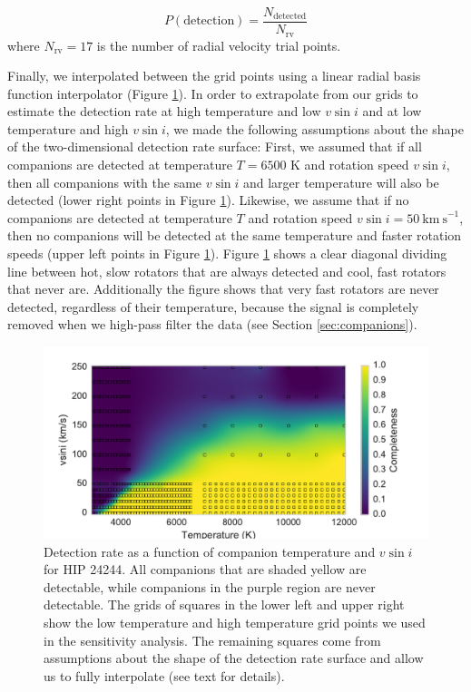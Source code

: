 \documentclass{emulateapj}
\begin{document}
\begin{equation}
P(\mathrm{detection}) = \frac{N_\mathrm{detected}}{N_\mathrm{rv}}
\end{equation}
where $N_\mathrm{rv} = 17$ is the number of radial velocity trial points. 

Finally, we interpolated between the grid points using a linear radial basis function interpolator (Figure \ref{fig:detrate_2d}). In order to extrapolate from our grids to estimate the detection rate at high temperature and low $v\sin{i}$ and at low temperature and high $v\sin{i}$, we made the following assumptions about the shape of the two-dimensional detection rate surface: First, we assumed that if all companions are detected at temperature $T=6500$ K and rotation speed $v\sin{i}$, then all companions with the same $v\sin{i}$ and larger temperature will also be detected (lower right points in Figure \ref{fig:detrate_2d}). Likewise, we assume that if no companions are detected at temperature $T$ and rotation speed $v\sin{i} = 50\ \mathrm{km\ s}^{-1}$, then no companions will be detected at the same temperature and faster rotation speeds (upper left points in Figure \ref{fig:detrate_2d}). Figure \ref{fig:detrate_2d} shows a clear diagonal dividing line between hot, slow rotators that are always detected and cool, fast rotators that never are. Additionally the figure shows that very fast rotators are never detected, regardless of their temperature, because the signal is completely removed when we high-pass filter the data (see Section \ref{sec:companions}).



\begin{figure}
\includegraphics[width=\columnwidth]{HIP_24244_20130919.pdf}
\caption{Detection rate as a function of companion temperature and $v\sin{i}$ for HIP 24244. All companions that are shaded yellow are detectable, while companions in the purple region are never detectable. The grids of squares in the lower left and upper right show the low temperature and high temperature grid points we used in the sensitivity analysis. The remaining squares come from assumptions about the shape of the detection rate surface and allow us to fully interpolate (see text for details).}
\label{fig:detrate_2d}
\end{figure}
\end{document}
